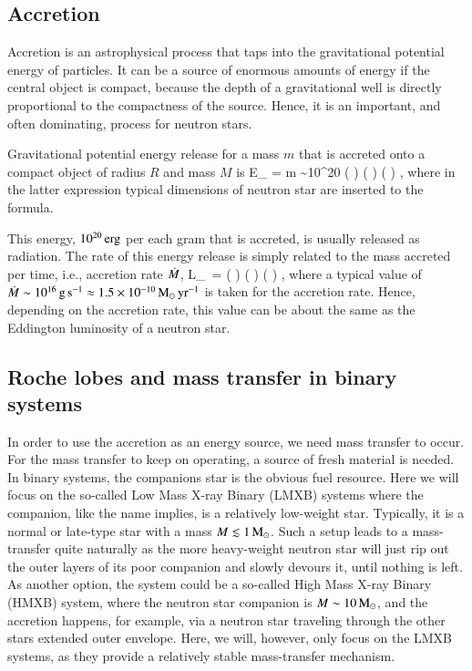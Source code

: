 \subsection{Accretion}

Accretion is an astrophysical process that taps into the gravitational potential energy of particles.
It can be a source of enormous amounts of energy if the central object is compact, because the depth of a gravitational well is directly proportional to the compactness of the source.
Hence, it is an important, and often dominating, process for neutron stars.\cite[For an introduction, see e.g., ][]{FKR02}

Gravitational potential energy release for a mass $m$ that is accreted onto a compact object of radius $R$ and mass $M$ is
\be
\Delta E_{} = m  \sim 10^{20} \left(  \right) \left(  \right) \left(  \right) \erg,
\ee
where in the latter expression typical dimensions of neutron star are inserted to the formula.

This energy, $10^{20} \, \mathrm{erg}$ per each gram that is accreted, is usually released as radiation.
The rate of this energy release is simply related to the mass accreted per time, i.e., accretion rate $\dot{M}$, 
\be
L_{} = \Mdot {} \approx {} \left(  \right) \left(  \right) \left(  \right) \ergs,
\ee
where a typical value of $\dot{M} \sim 10^{16} \, \mathrm{g}\,\mathrm{s}^{-1} \approx 1.5 \times 10^{-10} \, \mathrm{M}_{\odot}\,\mathrm{yr}^{-1}$ is taken for the accretion rate.
Hence, depending on the accretion rate, this value can be about the same as the Eddington luminosity  of a neutron star.



\subsection{Roche lobes and mass transfer in binary systems}

In order to use the accretion as an energy source, we need mass transfer to occur.
For the mass transfer to keep on operating, a source of fresh material is needed.
In binary systems, the companions star is the obvious fuel resource.
Here we will focus on the so-called Low Mass X-ray Binary (LMXB) systems where the companion, like the name implies, is a relatively low-weight star.\cite{TH06}
Typically, it is a normal or late-type star with a mass $M \lesssim 1 \, \mathrm{M}_{\odot}$.
Such a setup leads to a mass-transfer quite naturally as the more heavy-weight neutron star will just rip out the outer layers of its poor companion and slowly devours it, until nothing is left.
As another option, the system could be a so-called High Mass X-ray Binary (HMXB) system, where the neutron star companion is $M \sim 10\, \mathrm{M}_{\odot}$, and the accretion happens, for example, via a neutron star traveling through the other stars extended outer envelope.
Here, we will, however, only focus on the LMXB systems, as they provide a relatively stable mass-transfer mechanism.



